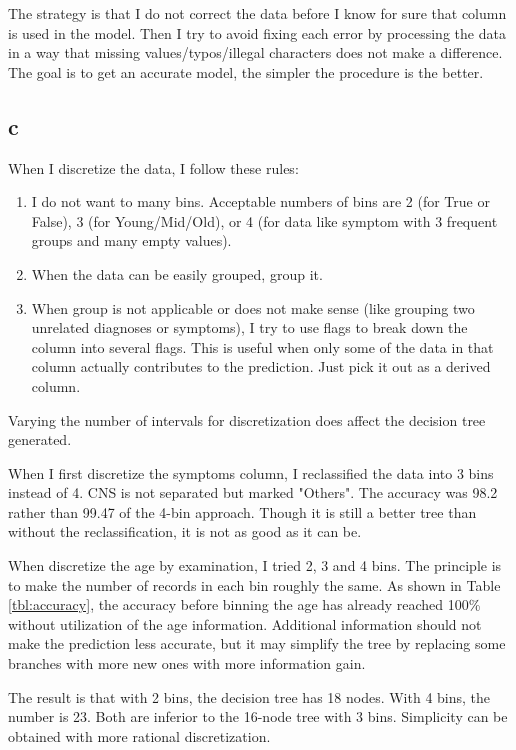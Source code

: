 \documentclass[12pt]{article}
\begin{document}
The strategy is that I do not correct the data before I know for sure that column is used in the model. Then I try to avoid fixing each error by processing the data in a way that missing values/typos/illegal characters does not make a difference. The goal is to get an accurate model, the simpler the procedure is the better.

\subsection{c} %
\label{sub:4c}
When I discretize the data, I follow these rules:
\begin{enumerate}
	\item I do not want to many bins. Acceptable numbers of bins are 2 (for True or False), 3 (for Young/Mid/Old), or 4 (for data like symptom with 3 frequent groups and many empty values).
	\item When the data can be easily grouped, group it.
	\item When group is not applicable or does not make sense (like grouping two unrelated diagnoses or symptoms), I try to use flags to break down the column into several flags. This is useful when only some of the data in that column actually contributes to the prediction. Just pick it out as a derived column.
\end{enumerate}

Varying the number of intervals for discretization does affect the decision tree generated.

When I first discretize the symptoms column, I reclassified the data into 3 bins instead of 4. CNS is not separated but marked "Others". The accuracy was 98.2 rather than 99.47 of the 4-bin approach. Though it is still a better tree than without the reclassification, it is not as good as it can be.

When discretize the age by examination, I tried 2, 3 and 4 bins. The principle is to make the number of records in each bin roughly the same.
As shown in Table \ref{tbl:accuracy}, the accuracy before binning the age has already reached 100\% without utilization of the age information. Additional information should not make the prediction less accurate, but it may simplify the tree by replacing some branches with more new ones with more information gain.

The result is that with 2 bins, the decision tree has 18 nodes. With 4 bins, the number is 23. Both are inferior to the 16-node tree with 3 bins.
Simplicity can be obtained with more rational discretization.
\end{document}
